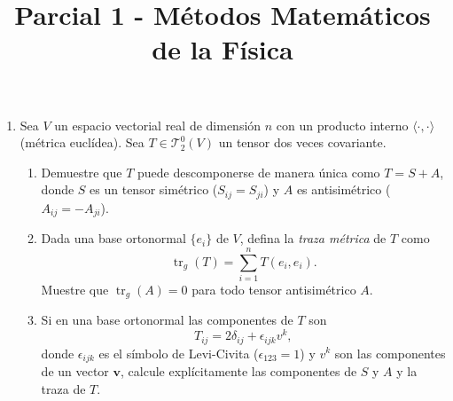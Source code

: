 \documentclass[12pt]{article}
\title{Parcial 1 - Métodos Matemáticos de la Física}
\author{}
\date{}
\begin{document}
\maketitle

\begin{enumerate}

\item[\textbf{Problema 1}] Sea \(V\) un espacio vectorial real de dimensión \(n\) con un producto interno \(\langle \cdot , \cdot \rangle\) (métrica euclídea). Sea \(T \in \mathcal{T}^0_2(V)\) un tensor dos veces covariante.

\begin{enumerate}
    \item[a)] Demuestre que \(T\) puede descomponerse de manera única como \(T = S + A\), donde \(S\) es un tensor simétrico (\(S_{ij} = S_{ji}\)) y \(A\) es antisimétrico (\(A_{ij} = -A_{ji}\)).
    
    \item[b)] Dada una base ortonormal \(\{e_i\}\) de \(V\), defina la \textit{traza métrica} de \(T\) como 
    \[
    \operatorname{tr}_g(T) = \sum_{i=1}^n T(e_i, e_i).
    \]
    Muestre que \(\operatorname{tr}_g(A) = 0\) para todo tensor antisimétrico \(A\).
    
    \item[c)] Si en una base ortonormal las componentes de \(T\) son 
    \[
    T_{ij} = 2\delta_{ij} + \epsilon_{ijk}v^k,
    \]
    donde \(\epsilon_{ijk}\) es el símbolo de Levi-Civita (\(\epsilon_{123}=1\)) y \(v^k\) son las componentes de un vector \(\mathbf{v}\), calcule explícitamente las componentes de \(S\) y \(A\) y la traza de \(T\).
\end{enumerate}

\vspace{1cm}


\end{enumerate}
\end{document}
